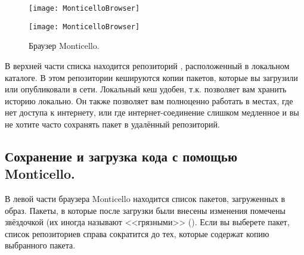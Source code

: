 \documentclass[a4paper,10pt,twoside]{book}
\begin{document}
{\begin{figure}[hbt]
\ifluluelse
	{\centerline {\texttt{[image: MonticelloBrowser]}}}
	{\centerline {\texttt{[image: MonticelloBrowser]}}}
\caption{Браузер Monticello.
}
\end{figure}

В верхней части списка находится репозиторий , расположенный в локальном каталоге. В этом репозитории кешируются копии пакетов, которые вы загрузили или опубликовали в сети. Локальный кеш удобен, т.к. позволяет вам хранить историю локально. Он также позволяет вам полноценно работать в местах, где нет доступа к интернету, или где интернет-соединение слишком медленное и вы не хотите часто сохранять пакет в удалённый репозиторий.


\subsection{Сохранение и загрузка кода с помощью Monticello.}
В левой части браузера Monticello находится список пакетов, загруженных в образ. Пакеты, в которые после загрузки были внесены изменения помечены звёздочкой (их иногда называют <<грязными>> (). Если вы выберете пакет, список репозиториев справа сократится до тех, которые содержат копию выбранного пакета.

}
\end{document}
